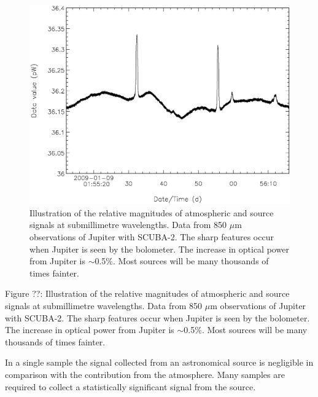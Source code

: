 \documentclass[twoside,11pt]{article}
\newcommand{\htmladdimg}[1]{}
\newenvironment{latexonly}{}{}
\renewcommand{\_}{\texttt{\symbol{95}}}
\begin{document}
\begin{latexonly}
   \begin{figure}[hbt]
   \begin{center}
     \includegraphics[width=150mm]{sun258_submmsignal.eps}
     \caption{Illustration of the relative magnitudes of atmospheric
       and source signals at submillimetre wavelengths. Data from 850
       $\mu$m observations of Jupiter with SCUBA-2. The sharp features
       occur when Jupiter is seen by the bolometer. The increase in
       optical power from Jupiter is $\sim$0.5\%. Most sources will be
       many thousands of times fainter.}
     \label{fig:signal}
   \end{center}
   \end{figure}
\end{latexonly}
\begin{htmlonly}
   \label{fig:signal}
   \htmladdimg{sun258_submmsignal.gif}

   Figure ??: Illustration of the relative magnitudes of atmospheric
   and source signals at submillimetre wavelengths. Data from 850
   $\mu$m observations of Jupiter with SCUBA-2. The sharp features
   occur when Jupiter is seen by the bolometer. The increase in
   optical power from Jupiter is $\sim$0.5\%. Most sources will be
   many thousands of times fainter.

\end{htmlonly}

In a single sample the signal collected from an astronomical source is
negligible in comparison with the contribution from the
atmosphere. Many samples are required to collect a statistically
significant signal from the source. 
\end{document}
